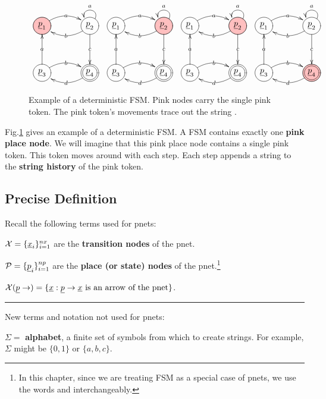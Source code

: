 \begin{figure}[h!]
$$
\begin{array}{cccc}
\xymatrix@C=3pc@R=3pc{
\PinkCircle{\rvp_1}\ar@/^1pc/[r]|a
&
\Circle{\rvp_2}\ar@/^1pc/[l]|b
\ar[d]|c \ar@(ru,lu)[]_a
\\
\Circle{\rvp_3}\ar@/^1pc/[r]|b
\ar[u]|a
&\DCircle{\rvp_4}\ar@/^1pc/[l]|d
}&
\xymatrix@C=3pc@R=3pc{
\Circle{\rvp_1}\ar@/^1pc/[r]|a
&
\PinkCircle{\rvp_2}\ar@/^1pc/[l]|b
\ar[d]|c \ar@(ru,lu)[]_a
\\
\Circle{\rvp_3}\ar@/^1pc/[r]|b
\ar[u]|a
&\DCircle{\rvp_4}\ar@/^1pc/[l]|d
}&
\xymatrix@C=3pc@R=3pc{
\Circle{\rvp_1}\ar@/^1pc/[r]|a
&
\PinkCircle{\rvp_2}\ar@/^1pc/[l]|b
\ar[d]|c \ar@(ru,lu)[]_a
\\
\Circle{\rvp_3}\ar@/^1pc/[r]|b
\ar[u]|a
&\DCircle{\rvp_4}\ar@/^1pc/[l]|d
}&
\xymatrix@C=3pc@R=3pc{
\Circle{\rvp_1}\ar@/^1pc/[r]|a
&
\Circle{\rvp_2}\ar@/^1pc/[l]|b
\ar[d]|c \ar@(ru,lu)[]_a
\\
\Circle{\rvp_3}\ar@/^1pc/[r]|b
\ar[u]|a
&\PinkDCircle{\rvp_4}\ar@/^1pc/[l]|d
}
\end{array}
$$
\caption{Example of a deterministic FSM. Pink nodes carry the single pink token.
The pink token's movements trace out the string .}
\label{fig-det-fsm}
\end{figure}
Fig.\ref{fig-det-fsm}
gives an example of a deterministic
FSM. A FSM contains exactly one {\bf pink place node}. We will 
imagine that this pink place node contains a single pink token. This token moves around with each step.
Each step appends a string to the {\bf string history} of the pink token.

\subsection{Precise Definition}

Recall the following terms used for pnets:

$\calx =\{\rvx_i\}_{i=1}^{nx}$ are the {\bf transition nodes} of the pnet.

$\calp =\{\rvp_i\}_{i=1}^{np}$ are the {\bf place (or state) nodes} of the pnet.\footnote{In this
chapter, since we are treating FSM as a special case of pnets, we use the words  and
 interchangeably.}

$\calx(\rvp\rarrow)=\{\rvx: \rvp\rarrow\rvx \text{ is an arrow of the pnet}\}$.

\hrule
New terms and notation not used for pnets:

$\Sigma=$ {\bf alphabet}, a finite set of symbols
from which to create strings. For example,
$\Sigma$ might be $\{0, 1\}$ or $\{a, b, c\}$.

